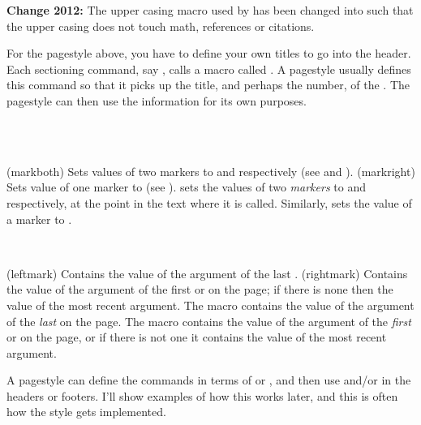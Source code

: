 \textbf{Change 2012:} The upper casing macro used by \cmd{\uppercaseheads} has
been changed into \cmd{\MakeTextUppercase} such that the upper casing
does not touch math, references or citations.


    For the  pagestyle above, you have to define your own
titles to go into the header. Each sectioning command, 
say , 
calls a macro called . A pagestyle usually defines this command
so that it picks up the title, and perhaps the number, of the . The
pagestyle can then use the information for its own purposes. 

\begin{syntax}
\cmd{\markboth} \\
\cmd{\markright} \\
\end{syntax}
\glossary(markboth)%
  {}%
  {Sets values of two markers to  and  respectively
   (see  and ).}
\glossary(markright)%
  {}%
  {Sets value of one marker to  (see ).}
    \cmd{\markboth} sets the values of two \emph{markers}
to  and  respectively, at the point in the text 
where it is called. Similarly, \cmd{\markright} sets the value of a
marker to .

\begin{syntax}
\cmd{\leftmark} \cmd{\rightmark} \\
\end{syntax}
\glossary(leftmark)%
  {}%
  {Contains the value of the  argument of the last .}
\glossary(rightmark)%
  {}%
  {Contains the value of the  argument of the first 
   or  on the page; if there is none then the value of the most
   recent  argument.}
The macro \cmd{\leftmark} contains the value of the  argument
of the \emph{last} \cmd{\markboth} on the page. The macro \cmd{\rightmark}
contains the value of the  argument of the \emph{first}
\cmd{\markboth} or \cmd{\markright} on the page, or if there is not one it
contains the value of the most recent  argument.

    A pagestyle can define the  commands in terms of 
\cmd{\markboth} or \cmd{\markright}, and then use \cmd{\leftmark} and/or
\cmd{\rightmark} in the headers or footers. 
I'll show examples of how this
works later, and this is often how the  style gets 
implemented.

